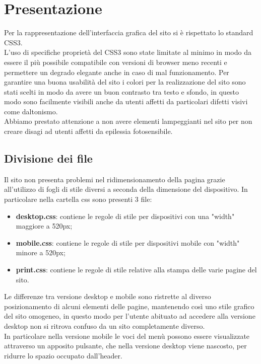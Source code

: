 \section{Presentazione}
Per la rappresentazione dell'interfaccia grafica del sito si è rispettato lo standard CSS3.\\
L'uso di specifiche proprietà del CSS3 sono state limitate al minimo in modo da essere il più possibile compatibile con versioni di browser meno recenti e permettere un degrado elegante anche in caso di mal funzionamento.
Per garantire una buona usabilità del sito i colori per la realizzazione del sito sono stati scelti in modo da avere un buon contrasto tra testo e sfondo, in questo modo sono facilmente visibili anche da utenti affetti da particolari
difetti visivi come daltonismo.\\
Abbiamo prestato attenzione a non avere elementi lampeggianti nel sito per non creare disagi ad utenti affetti da epilessia fotosensibile.

\subsection{Divisione dei file}
Il sito non presenta problemi nel ridimensionamento della pagina grazie all'utilizzo di fogli di stile diversi a seconda della dimensione del dispositivo. In particolare nella cartella css sono presenti 3 file:
\begin{itemize} 
	\item \textbf{desktop.css}: contiene le regole di stile per dispositivi con una "width" maggiore a 520px; 
	\item \textbf{mobile.css}: contiene le regole di stile per dispositivi mobile con "width" minore a 520px;
	\item \textbf{print.css}: contiene le regole di stile relative alla stampa delle varie pagine del sito.
\end{itemize}
Le differenze tra versione desktop e mobile sono ristrette al diverso posizionamento di alcuni elementi delle pagine, mantenendo così uno stile grafico del sito omogeneo, in questo modo per l'utente abituato ad accedere alla
versione desktop non si ritrova confuso da un sito completamente diverso. \\
In particolare nella versione mobile le voci del menù possono essere visualizzate attraverso un apposito pulsante, che nella versione desktop viene nascosto, per ridurre lo spazio occupato dall'header.